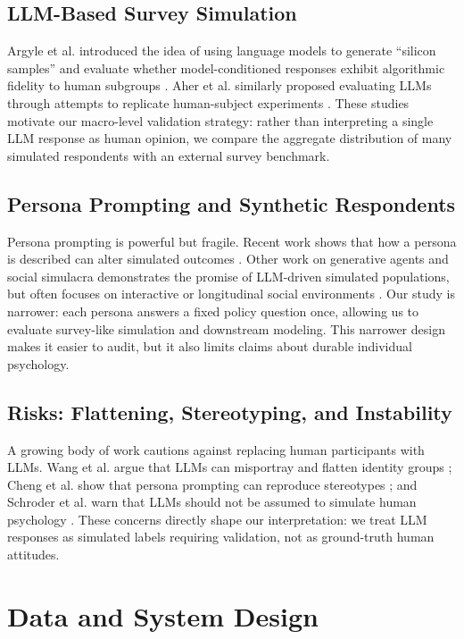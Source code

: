 ﻿\documentclass[10pt,twocolumn]{article}
\begin{document}
\subsection{LLM-Based Survey Simulation}
Argyle et al. introduced the idea of using language models to generate ``silicon samples'' and evaluate whether model-conditioned responses exhibit algorithmic fidelity to human subgroups \cite{argyle2023out}. Aher et al. similarly proposed evaluating LLMs through attempts to replicate human-subject experiments \cite{aher2023using}. These studies motivate our macro-level validation strategy: rather than interpreting a single LLM response as human opinion, we compare the aggregate distribution of many simulated respondents with an external survey benchmark.

\subsection{Persona Prompting and Synthetic Respondents}
Persona prompting is powerful but fragile. Recent work shows that how a persona is described can alter simulated outcomes \cite{lutz2025prompt}. Other work on generative agents and social simulacra demonstrates the promise of LLM-driven simulated populations, but often focuses on interactive or longitudinal social environments \cite{park2022social,park2023generative}. Our study is narrower: each persona answers a fixed policy question once, allowing us to evaluate survey-like simulation and downstream modeling. This narrower design makes it easier to audit, but it also limits claims about durable individual psychology.

\subsection{Risks: Flattening, Stereotyping, and Instability}
A growing body of work cautions against replacing human participants with LLMs. Wang et al. argue that LLMs can misportray and flatten identity groups \cite{wang2024replace}; Cheng et al. show that persona prompting can reproduce stereotypes \cite{cheng2023marked}; and Schroder et al. warn that LLMs should not be assumed to simulate human psychology \cite{schroder2025psychology}. These concerns directly shape our interpretation: we treat LLM responses as simulated labels requiring validation, not as ground-truth human attitudes.

\section{Data and System Design}
\end{document}
